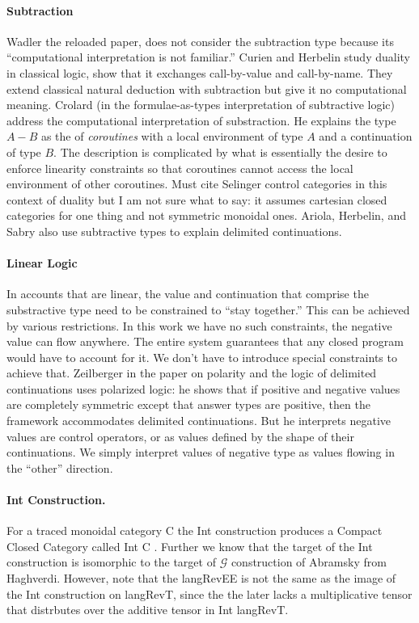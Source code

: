 \documentclass[preprint]{sigplanconf}
\newcommand{\G}{\ensuremath{\mathcal{G}}\xspace}
\begin{document}
\paragraph*{Subtraction} Wadler the reloaded paper, does not consider the
subtraction type because its ``computational interpretation is not
familiar.'' Curien and Herbelin study duality in classical logic, show that
it exchanges call-by-value and call-by-name. They extend classical natural
deduction with subtraction but give it no computational meaning. Crolard (in
the formulae-as-types interpretation of subtractive logic) address the
computational interpretation of substraction. He explains the type $A-B$ as
the of \emph{coroutines} with a local environment of type $A$ and a
continuation of type $B$. The description is complicated by what is
essentially the desire to enforce linearity constraints so that coroutines
cannot access the local environment of other coroutines. Must cite Selinger
control categories in this context of duality but I am not sure what to say:
it assumes cartesian closed categories for one thing and not symmetric
monoidal ones. Ariola, Herbelin, and Sabry also use subtractive types to
explain delimited continuations. 

\paragraph*{Linear Logic} In accounts that are linear, the value and
continuation that comprise the substractive type need to be constrained to
``stay together.'' This can be achieved by various restrictions. In this work
we have no such constraints, the negative value can flow anywhere. The entire
system guarantees that any closed program would have to account for it. We
don't have to introduce special constraints to achieve that. Zeilberger in
the paper on polarity and the logic of delimited continuations uses polarized
logic: he shows that if positive and negative values are completely symmetric
except that answer types are positive, then the framework accommodates
delimited continuations. But he interprets negative values are control
operators, or as values defined by the shape of their continuations. We
simply interpret values of negative type as values flowing in the ``other''
direction.

\paragraph*{Int Construction.}
For a traced monoidal category {{C}} the Int construction produces a
Compact Closed Category called Int {{C}} \cite{joyal1996traced}.
Further we know that the target of the Int construction is isomorphic
to the target of \G construction of Abramsky \cite{Abramsky96:0} from
Haghverdi. However, note that the {{langRevEE}} is not the same as the
image of the Int construction on {{langRevT}}, since the the later
lacks a multiplicative tensor that distrbutes over the additive tensor
in Int {{langRevT}}.
\end{document}
